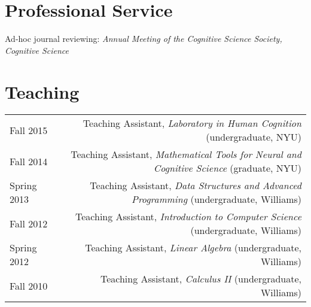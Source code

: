 \documentclass[12pt]{my_cv}
\begin{document}
\section{Professional Service}

Ad-hoc journal reviewing: \emph{Annual Meeting of the Cognitive Science Society,
Cognitive Science}

\section{Teaching}
\begin{tabular}{L R}
Fall 2015 & Teaching Assistant, \emph{Laboratory in Human Cognition} (undergraduate, NYU)\\ [0.5ex]
Fall 2014&Teaching Assistant, \emph{Mathematical Tools for Neural and Cognitive Science} (graduate, NYU)\\ [0.5ex]
Spring 2013&Teaching Assistant, \emph{Data Structures and Advanced Programming} (undergraduate, Williams)\\[0.5ex]
Fall 2012&Teaching Assistant, \emph{Introduction to Computer Science} (undergraduate, Williams)\\[0.5ex]
Spring 2012&Teaching Assistant, \emph{Linear Algebra} (undergraduate, Williams)\\[0.5ex]
Fall 2010&Teaching Assistant, \emph{Calculus II} (undergraduate, Williams)\\[0.5ex]
\end{tabular}
\end{document}
